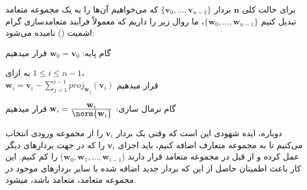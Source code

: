 {\begin{spacing}{1.5}
        برای حالت کلی $\textbf{n}$ بردار $\{\textbf{v}_{0},...,\textbf{v}_{n-1}\}$ که می‌خواهیم آن‌ها را به یک مجموعه متعامد تبدیل کنیم $\{\textbf{w}_{0},...,\textbf{w}_{n-1}\}$، ما روال زیر را داریم که معمولاً فرآیند متعامدسازی گرام اشمیت () نامیده می‌شود:

        \begin{center}
            گام پایه: $\textbf{w}_{0}=\textbf{v}_{0}$ قرار میدهیم

            به ازای $1\leq i\leq n-1$، \\ $\textbf{w}_{i}=\textbf{v}_{i}-\sum\limits_{j=1}^{i-1}proj_{\textbf{w}_{j}}(\textbf{v}_{i})$ قرار میدهیم

            گام نرمال سازی: $\textbf{w}_{i}=\frac{\displaystyle\textbf{w}_{i}}{\displaystyle\norm{\textbf{w}_{i}}}$ قرار میدهیم
        \end{center}

        دوباره، ایده شهودی این است که وقتی یک بردار $\textbf{v}_{i}$ را از مجموعه ورودی انتخاب می‌کنیم تا به مجموعه متعارف اضافه کنیم،
        باید اجزای $\textbf{v}_{i}$ را که در جهت بردارهای دیگر عمل کرده و از قبل در مجموعه متعامد قرار دارند ($\textbf{w}_{0},\textbf{w}_{1},...,\textbf{w}_{i-1}$) را کم کنیم.
        این کار باعث اطمینان حاصل از این که بردار جدید اضافه شده با سایر بردارهای موجود در مجموعه متعامد، متعامد باشد، میشود.
    \end{spacing}
}


